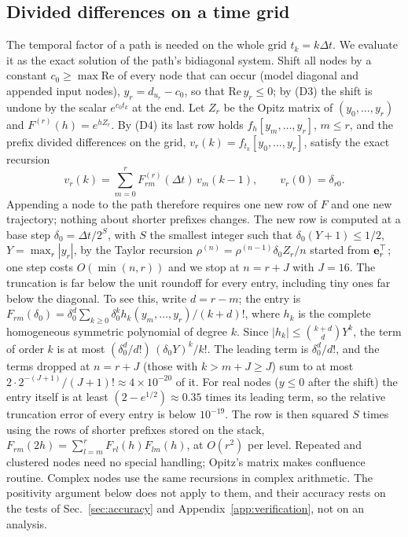 \documentclass[aps,pra,superscriptaddress,floatfix,longbibliography,twocolumn]{revtex4-2}
\newcommand{\be}{{\bf e}}
\begin{document}
\subsection{Divided differences on a time grid}\label{sec:kernel}
The temporal factor of a path is needed on the whole grid $t_k=k\Delta t$. We evaluate it as the exact solution of the path's bidiagonal system. Shift all nodes by a constant $c_0\ge\max\mathrm{Re}$ of every node that can occur (model diagonal and appended input nodes), $y_r=d_{u_r}-c_0$, so that $\mathrm{Re}\,y_r\le0$; by (D3) the shift is undone by the scalar $e^{c_0t_k}$ at the end. Let $Z_r$ be the Opitz matrix of $(y_0,\dots,y_r)$ and $F^{(r)}(h)=e^{hZ_r}$. By (D4) its last row holds $f_h[y_m,\dots,y_r]$, $m\le r$, and the prefix divided differences on the grid,
$v_r(k)=f_{t_k}[y_0,\dots,y_r]$, satisfy the exact recursion
\begin{equation}\label{eq:traj}
v_r(k)=\sum_{m=0}^{r}F^{(r)}_{rm}(\Delta t)\,v_m(k-1),\qquad v_r(0)=\delta_{r0}.
\end{equation}
Appending a node to the path therefore requires one new row of $F$ and one new trajectory; nothing about shorter prefixes changes. The new row is computed at a base step $\delta_0=\Delta t/2^S$, with $S$ the smallest integer such that $\delta_0(Y+1)\le1/2$, $Y=\max_r|y_r|$, by the Taylor recursion $\rho^{(n)}=\rho^{(n-1)}\delta_0Z_r/n$ started from $\be_r^\top$; one step costs $O(\min(n,r))$ and we stop at $n=r+J$ with $J=16$. The truncation is far below the unit roundoff for every entry, including tiny ones far below the diagonal. To see this, write $d=r-m$; the entry is $F_{rm}(\delta_0)=\delta_0^{d}\sum_{k\ge0}\delta_0^k h_k(y_m,\dots,y_r)/(k+d)!$, where $h_k$ is the complete homogeneous symmetric polynomial of degree $k$. Since $|h_k|\le\binom{k+d}{d}Y^k$, the term of order $k$ is at most $(\delta_0^d/d!)\,(\delta_0Y)^k/k!$. The leading term is $\delta_0^d/d!$, and the terms dropped at $n=r+J$ (those with $k>m+J\ge J$) sum to at most $2\cdot2^{-(J+1)}/(J+1)!\approx4\times10^{-20}$ of it. For real nodes ($y\le0$ after the shift) the entry itself is at least $(2-e^{1/2})\approx0.35$ times its leading term, so the relative truncation error of every entry is below $10^{-19}$. The row is then squared $S$ times using the rows of shorter prefixes stored on the stack, $F_{rm}(2h)=\sum_{l=m}^{r}F_{rl}(h)F_{lm}(h)$, at $O(r^2)$ per level. Repeated and clustered nodes need no special handling; Opitz's matrix makes confluence routine. Complex nodes use the same recursions in complex arithmetic. The positivity argument below does not apply to them, and their accuracy rests on the tests of Sec.~\ref{sec:accuracy} and Appendix~\ref{app:verification}, not on an analysis.
\end{document}
